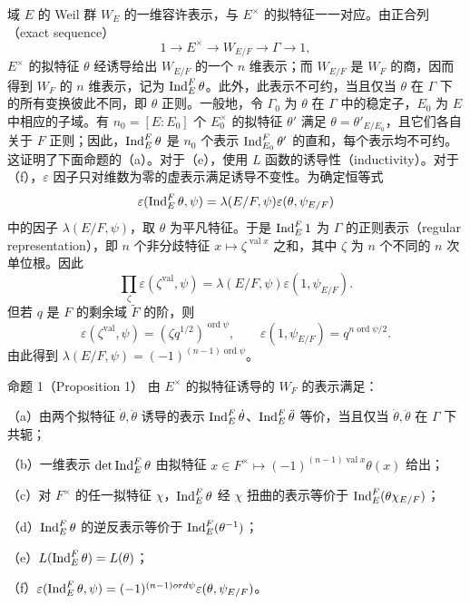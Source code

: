 域 $E$ 的 Weil 群 $W_E$ 的一维容许表示，与 $E^\times$ 的拟特征一一对应。由正合列（exact sequence）
\[
1\longrightarrow E^\times\longrightarrow W_{E/F}\longrightarrow\Gamma\longrightarrow1,
\]
$E^\times$ 的拟特征 $\theta$ 经诱导给出 $W_{E/F}$ 的一个 $n$ 维表示；而 $W_{E/F}$ 是 $W_F$ 的商，因而得到 $W_F$ 的 $n$ 维表示，记为 $\Ind_E^F\theta$。此外，此表示不可约，当且仅当 $\theta$ 在 $\Gamma$ 下的所有变换彼此不同，即 $\theta$ 正则。一般地，令 $\Gamma_0$ 为 $\theta$ 在 $\Gamma$ 中的稳定子，$E_0$ 为 $E$ 中相应的子域。有 $n_0=[E:E_0]$ 个 $E_0^\times$ 的拟特征 $\theta'$ 满足 $\theta=\theta'_{E/E_0}$，且它们各自关于 $F$ 正则；因此，$\Ind_E^F\theta$ 是 $n_0$ 个表示 $\Ind_{E_0}^F\theta'$ 的直和，每个表示均不可约。这证明了下面命题的（a）。对于（e），使用 $L$ 函数的诱导性（inductivity）。对于（f），$\varepsilon$ 因子只对维数为零的虚表示满足诱导不变性。为确定恒等式
\[
\varepsilon(\Ind_E^F\theta,\psi)=\lambda(E/F,\psi)\varepsilon(\theta,\psi_{E/F})
\]
中的因子 $\lambda(E/F,\psi)$，取 $\theta$ 为平凡特征。于是 $\Ind_E^F1$ 为 $\Gamma$ 的正则表示（regular representation），即 $n$ 个非分歧特征 $x\mapsto\zeta^{\operatorname{val}x}$ 之和，其中 $\zeta$ 为 $n$ 个不同的 $n$ 次单位根。因此
\[
\prod_\zeta\varepsilon(\zeta^{\operatorname{val}},\psi)=\lambda(E/F,\psi)\varepsilon(1,\psi_{E/F}).
\]
但若 $q$ 是 $F$ 的剩余域 $\widetilde F$ 的阶，则
\[
\varepsilon(\zeta^{\operatorname{val}},\psi)=(\zeta q^{1/2})^{\operatorname{ord}\psi},\qquad
\varepsilon(1,\psi_{E/F})=q^{n\operatorname{ord}\psi/2}.
\]
由此得到 $\lambda(E/F,\psi)=(-1)^{(n-1)\operatorname{ord}\psi}$。
\begin{originaltheorem}{命题 1（Proposition 1）}
由 $E^\times$ 的拟特征诱导的 $W_F$ 的表示满足：

（a）由两个拟特征 $\dot\theta,\ddot\theta$ 诱导的表示 $\Ind_E^F\dot\theta$、$\Ind_E^F\ddot\theta$ 等价，当且仅当 $\dot\theta,\ddot\theta$ 在 $\Gamma$ 下共轭；

（b）一维表示 $\det\Ind_E^F\theta$ 由拟特征 $x\in F^\times\mapsto(-1)^{(n-1)\operatorname{val}x}\theta(x)$ 给出；

（c）对 $F^\times$ 的任一拟特征 $\chi$，$\Ind_E^F\theta$ 经 $\chi$ 扭曲的表示等价于 $\Ind_E^F(\theta\chi_{E/F})$；

（d）$\Ind_E^F\theta$ 的逆反表示等价于 $\Ind_E^F(\theta^{-1})$；

（e）$L(\Ind_E^F\theta)=L(\theta)$；

（f）$\varepsilon(\Ind_E^F\theta,\psi)=(-1)^{(n-1)\operatorname{ord}\psi}\varepsilon(\theta,\psi_{E/F})$。
\end{originaltheorem}

